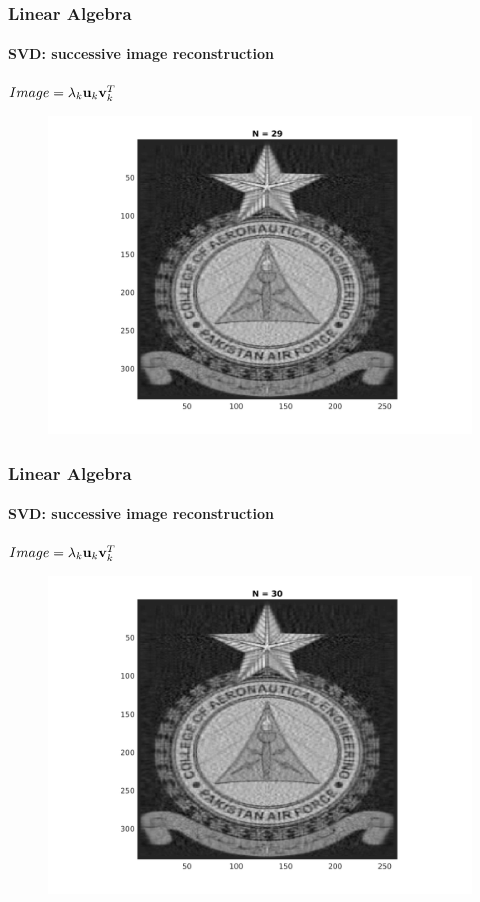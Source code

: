 \documentclass[hyperref={pdfpagelabels=true}]{beamer}
\begin{document}
\begin{frame}
\frametitle{Linear Algebra}
\framesubtitle{SVD: successive image reconstruction} 
\small{
\begin{center}
$Image = \lambda_k{\bf u}_k {\bf v}_k^T$
\end{center}}
\begin{figure}[!htb]
\centering
\includegraphics [scale=0.48]{n/b29.png}
\end{figure}
\end{frame}

\begin{frame}
\frametitle{Linear Algebra}
\framesubtitle{SVD: successive image reconstruction} 
\small{
\begin{center}
$Image = \lambda_k{\bf u}_k {\bf v}_k^T$
\end{center}}
\begin{figure}[!htb]
\centering
\includegraphics [scale=0.48]{n/b30.png}
\end{figure}
\end{frame}
\end{document}
